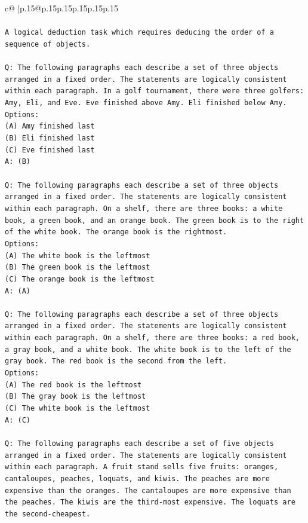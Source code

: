 \documentclass{article}
\begin{document}
{\begin{supertabular}{c@{$\;$}|p{.15\linewidth}@{}p{.15\linewidth}p{.15\linewidth}p{.15\linewidth}p{.15\linewidth}p{.15\linewidth}}
{{{\\ 
\\ 
\texttt{A logical deduction task which requires deducing the order of a sequence of objects.} \\
\\ 
\texttt{Q: The following paragraphs each describe a set of three objects arranged in a fixed order. The statements are logically consistent within each paragraph. In a golf tournament, there were three golfers: Amy, Eli, and Eve. Eve finished above Amy. Eli finished below Amy.} \\
\texttt{Options:} \\
\texttt{(A) Amy finished last} \\
\texttt{(B) Eli finished last} \\
\texttt{(C) Eve finished last} \\
\texttt{A: (B)} \\
\\ 
\texttt{Q: The following paragraphs each describe a set of three objects arranged in a fixed order. The statements are logically consistent within each paragraph. On a shelf, there are three books: a white book, a green book, and an orange book. The green book is to the right of the white book. The orange book is the rightmost.} \\
\texttt{Options:} \\
\texttt{(A) The white book is the leftmost} \\
\texttt{(B) The green book is the leftmost} \\
\texttt{(C) The orange book is the leftmost} \\
\texttt{A: (A)} \\
\\ 
\texttt{Q: The following paragraphs each describe a set of three objects arranged in a fixed order. The statements are logically consistent within each paragraph. On a shelf, there are three books: a red book, a gray book, and a white book. The white book is to the left of the gray book. The red book is the second from the left.} \\
\texttt{Options:} \\
\texttt{(A) The red book is the leftmost} \\
\texttt{(B) The gray book is the leftmost} \\
\texttt{(C) The white book is the leftmost} \\
\texttt{A: (C)} \\
\\ 
\texttt{Q: The following paragraphs each describe a set of five objects arranged in a fixed order. The statements are logically consistent within each paragraph. A fruit stand sells five fruits: oranges, cantaloupes, peaches, loquats, and kiwis. The peaches are more expensive than the oranges. The cantaloupes are more expensive than the peaches. The kiwis are the third{-}most expensive. The loquats are the second{-}cheapest.} \\
}}}
\end{supertabular}}
\end{document}
